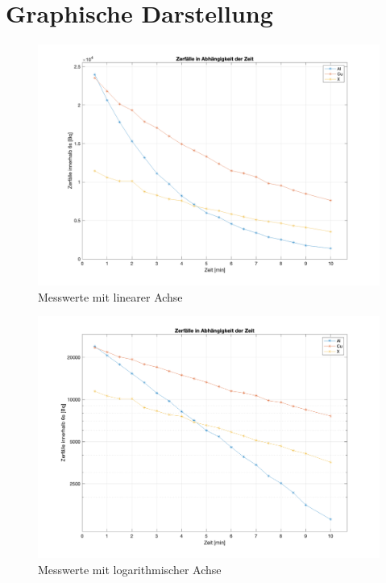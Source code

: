 \documentclass[12pt,german]{article}
\begin{document}
    \section{Graphische Darstellung}
    \begin{figure}[H]
        \centering
        \includegraphics[width=\textwidth]{Diagramm.png}
        \caption{Messwerte mit linearer Achse}
    \end{figure}
    \begin{figure}[H]
        \centering
        \includegraphics[width=\textwidth]{DiagrammLog.png}
        \caption{Messwerte mit logarithmischer Achse}
    \end{figure}
\end{document}
